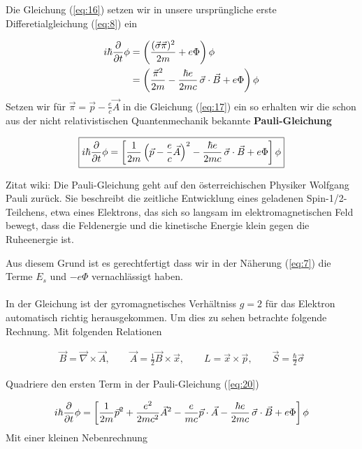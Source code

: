 Die Gleichung (\ref{eq:16}) setzen wir in unsere ursprüngliche erste Differetialgleichung (\ref{eq:8}) ein

\begin{align}
  \label{eq:17}
   i\hbar\pdiff_t\phi &= \left(\frac{(\vec\sigma\vec\pi)^2}{2m}  + e\Phi \right)\phi \notag \\
 &=  \left(\frac{\vec\pi^2}{2m} -  \frac{\hbar e}{2mc}\, \vec \sigma\cdot\vec B   + e\Phi\right) \phi 
\end{align}
Setzen wir für \(\vec\pi = \vec p - \frac{e}{c}\vec A\) in die Gleichung (\ref{eq:17}) ein so erhalten wir die schon aus der nicht relativistischen Quantenmechanik bekannte \textbf{Pauli-Gleichung}

\begin{align}
  \label{eq:18}
\boxed{   i\hbar\pdiff_t\phi =  \left[\frac{1}{2m}\left( \vec p - \frac{e}{c}\vec A\right)^2  -  \frac{\hbar e}{2mc}\, \vec \sigma\cdot\vec B   + e\Phi\right] \phi  }
\end{align}

Zitat wiki: Die Pauli-Gleichung geht auf den österreichischen Physiker Wolfgang Pauli zurück. Sie beschreibt die zeitliche Entwicklung eines geladenen Spin-1/2-Teilchens, etwa eines Elektrons, das sich so langsam im elektromagnetischen Feld bewegt, dass die Feldenergie und die kinetische Energie klein gegen die Ruheenergie ist.

Aus diesem Grund ist es gerechtfertigt dass wir in der Näherung (\ref{eq:7}) die Terme \(E_s\) und \(-e\Phi\) vernachlässigt haben.\\
\\
In der Gleichung ist der gyromagnetisches Verhältniss \(g=2\) für das Elektron automatisch richtig herausgekommen. Um dies zu sehen betrachte folgende Rechnung. Mit folgenden Relationen

\begin{align}
  \label{eq:20}
  \vec B = \vec \nabla\times\vec A,\qquad \vec A = \frac{1}{2}\vec B\times \vec x,\qquad L=\vec x\times\vec p,\qquad \vec S = \frac{\hbar}{2}\vec \sigma
\end{align}

Quadriere den ersten Term in der Pauli-Gleichung (\ref{eq:20})

\begin{align}
  \label{eq:21}
   i\hbar\pdiff_t\phi =  \left[\frac{1}{2m}\vec p^2 + \frac{e^2}{2mc^2}\vec A^2-\frac{e}{mc}\vec p\cdot \vec A -  \frac{\hbar e}{2mc}\, \vec \sigma\cdot\vec B   + e\Phi\right] \phi
\end{align}
Mit einer kleinen Nebenrechnung

